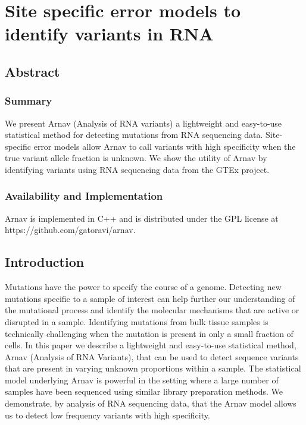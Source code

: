 
\chapter{Site specific error models to identify variants in RNA}
\label{chap:appendix A}

\section{Abstract}

\subsection{Summary}
We present Arnav (Analysis of RNA variants) a lightweight and easy-to-use statistical method for detecting mutations from RNA sequencing data. Site-specific error models allow Arnav to call variants with high specificity when the true variant allele fraction is unknown. We show the utility of Arnav by identifying variants using RNA sequencing data from the GTEx project.

\subsection{Availability and Implementation} 
Arnav is implemented in C++ and is distributed under the GPL license at https://github.com/gatoravi/arnav.

\section{Introduction}
Mutations have the power to specify the course of a genome. Detecting new mutations specific to a sample of interest can help further our understanding of the mutational process and identify the molecular mechanisms that are active or disrupted in a sample. Identifying mutations from bulk tissue samples is technically challenging when the mutation is present in only a small fraction of cells. In this paper we describe a lightweight and easy-to-use statistical method, Arnav (Analysis of RNA Variants), that can be used to detect sequence variants that are present in varying unknown proportions within a sample. The statistical model underlying Arnav is powerful in the setting where a large number of samples have been sequenced using similar library preparation methods. We demonstrate, by analysis of RNA sequencing data, that the Arnav model allows us to detect low frequency variants with high specificity.

